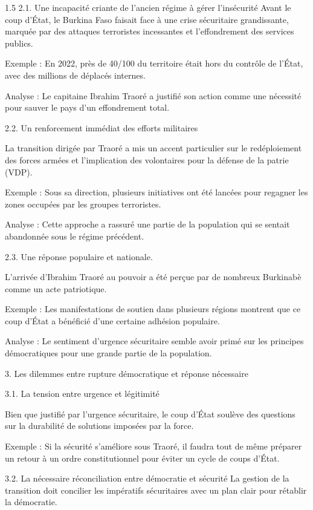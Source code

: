 \documentclass[12pt]{article}
\begin{document}
\begin{spacing}{1.5}
2.1. Une incapacité criante de l'ancien régime à gérer l'insécurité
Avant le coup d'État, le Burkina Faso faisait face à une crise sécuritaire grandissante, marquée par des attaques terroristes incessantes et l'effondrement des services publics.

Exemple : En 2022, près de 40/100 du territoire était hors du contrôle de l'État, avec des millions de déplacés internes.

Analyse : Le capitaine Ibrahim Traoré a justifié son action comme une nécessité pour sauver le pays d'un effondrement total.

2.2. Un renforcement immédiat des efforts militaires

La transition dirigée par Traoré a mis un accent particulier sur le redéploiement des forces armées et l'implication des volontaires pour la défense de la patrie (VDP).

Exemple : Sous sa direction, plusieurs initiatives ont été lancées pour regagner les zones occupées par les groupes terroristes.

Analyse : Cette approche a rassuré une partie de la population qui se sentait abandonnée sous le régime précédent.

2.3. Une réponse populaire et nationale.

L'arrivée d’Ibrahim Traoré au pouvoir a été perçue par de nombreux Burkinabè comme un acte patriotique.

Exemple : Les manifestations de soutien dans plusieurs régions montrent que ce coup d'État a bénéficié d'une certaine adhésion populaire.

Analyse : Le sentiment d'urgence sécuritaire semble avoir primé sur les principes démocratiques pour une grande partie de la population.

3. Les dilemmes entre rupture démocratique et réponse nécessaire

3.1. La tension entre urgence et légitimité

Bien que justifié par l'urgence sécuritaire, le coup d'État soulève des questions sur la durabilité de solutions imposées par la force.

Exemple : Si la sécurité s'améliore sous Traoré, il faudra tout de même préparer un retour à un ordre constitutionnel pour éviter un cycle de coups d'État.

3.2. La nécessaire réconciliation entre démocratie et sécurité
La gestion de la transition doit concilier les impératifs sécuritaires avec un plan clair pour rétablir la démocratie.


\end{spacing}
\end{document}
